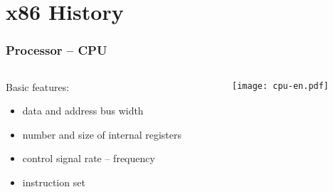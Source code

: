\documentclass{beamer}
\subtitle{Lecture 11. x86 Architecture}
\author{Pavel Píša \phantom{xxxxxxxxx} Petr Štěpán \\ \small\texttt{pisa@fel.cvut.cz}\phantom{xxxx}\small\texttt{stepan@fel.cvut.cz}}
\begin{document}
\maketitle

\section{x86 History}

\begin{frame}
\frametitle{Processor -- CPU}
\begin{columns}[t,onlytextwidth]
\begin{column}{0.4\textwidth}
Basic features:
  \begin{itemize}
    \item data and address bus width
    \item number and size of internal registers
    \item control signal rate -- frequency
    \item instruction set
  \end{itemize}
\end{column}
\begin{column}{0.52\textwidth}  
   \begin{center}
   \texttt{[image: cpu-en.pdf]}
   \end{center}
\end{column}
\end{columns}
\end{frame}
\end{document}
